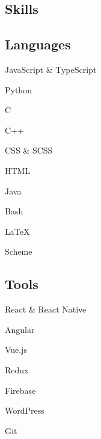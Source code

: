 \documentclass[letterpaper,10pt]{article}
\begin{document}
\begin{minipage}[t]{\dimexpr.33\textwidth-.5\columnsep}
\begin{flushleft}
\section{Skills}
\begin{minipage}[t]{.5\textwidth}
\begin{flushleft}

\subsection{Languages}
\begin{skillslist}
    \item JavaScript \& TypeScript
    \item Python
    \item C
    \item C++
    \item CSS \& SCSS
    \item HTML
    \item Java
    \item Bash
    \item \textrm{\LaTeX}
    \item Scheme
\end{skillslist}

\end{flushleft}
\end{minipage}%
\begin{minipage}[t]{.5\textwidth}

\subsection{Tools}
\begin{skillslist}
    \item React \& React Native
    \item Angular
    \item Vue.js
    \item Redux
    \item Firebase
    \item WordPress
    \item Git
\end{skillslist}


\end{minipage}
\end{flushleft}
\end{minipage}
\end{document}
